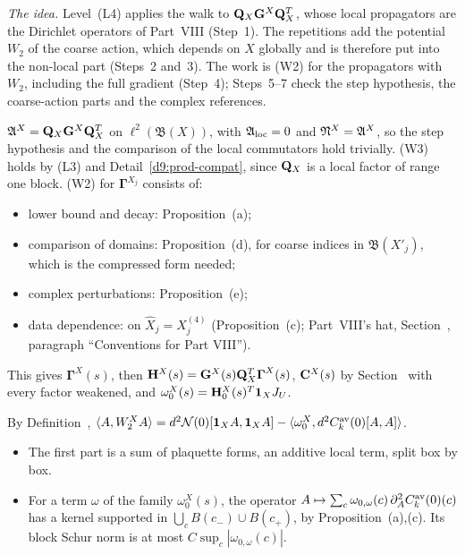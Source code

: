 \begin{detail}\label{d9:L4}
\emph{The idea.} Level~(L4) applies the walk to $\mathbf Q_X\mathbf G^X\mathbf Q_X^T$, whose local propagators are the Dirichlet operators of Part~VIII (Step~1). The repetitions add the potential $W_2$ of the coarse action, which depends on $X$ globally and is therefore put into the non-local part (Steps~2 and~3). The work is (W2) for the propagators with $W_2$, including the full gradient (Step~4); Steps~5--7 check the step hypothesis, the coarse-action parts and the complex references.
\begin{step}[(L4) with $W=0$]
$\mathfrak A^X=\mathbf Q_X\mathbf G^X\mathbf Q_X^T$ on $\ell^2(\mathfrak B(X))$, with $\mathfrak A_{\rm loc}=0$ and $\mathfrak N^X=\mathfrak A^X$, so the step hypothesis and the comparison of the local commutators hold trivially. (W3) holds by (L3) and Detail~\ref{d9:prod-compat}, since $\mathbf Q_X$ is a local factor of range one block. (W2) for $\boldsymbol\Gamma^{X_j}$ consists of:
\begin{itemize}
\item lower bound and decay: Proposition~(a);
\item comparison of domains: Proposition~(d), for coarse indices in $\mathfrak B(X'_j)$, which is the compressed form needed;
\item complex perturbations: Proposition~(e);
\item data dependence: on $\hat X_j=X_j^{(4)}$ (Proposition~(c); Part~VIII's hat, Section~, paragraph ``Conventions for Part VIII'').
\end{itemize}
This gives $\boldsymbol\Gamma^X(s)$, then $\mathbf H^X(s)=\mathbf G^X(s)\mathbf Q_X^T\boldsymbol\Gamma^X(s)$, $\mathbf C^X(s)$ by Section~ with every factor weakened, and $\omega_0^X(s)=\mathbf H_0^X(s)^T\mathbf 1_XJ_U$.
\end{step}
\begin{step}
By Definition~, $\langle A,W_2^XA\rangle=d^2\mathcal N(0)[\mathbf 1_XA,\mathbf 1_XA]-\langle \omega_0^X,d^2C^{\rm av}_k(0)[A,A]\rangle$.
\begin{itemize}
\item The first part is a sum of plaquette forms, an additive local term, split box by box.
\item For a term $\omega$ of the family $\omega_0^X(s)$, the operator $A\mapsto\sum_c\omega_{0,\omega}(c)\,\partial^2_AC^{\rm av}_k(0)(c)$ has a kernel supported in $\bigcup_c B(c_-)\cup B(c_+)$, by Proposition~(a),(c). Its block Schur norm is at most $C\sup_c|\omega_{0,\omega}(c)|$.

\end{itemize}
\end{step}
\end{detail}
